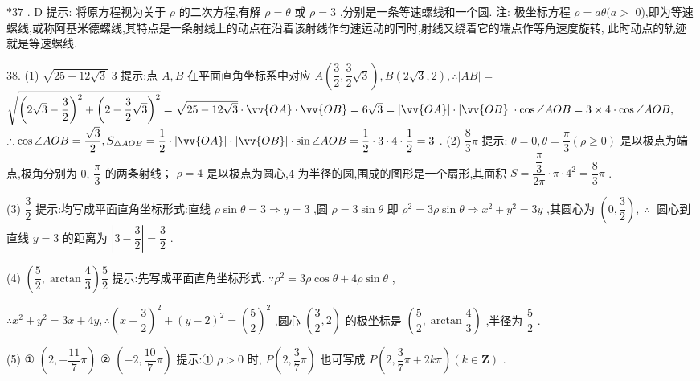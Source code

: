 $* {37}$ . D 提示: 将原方程视为关于 $\rho$ 的二次方程,有解 $\rho  = \theta$ 或 $\rho  = 3$ ,分别是一条等速螺线和一个圆. 注: 极坐标方程 $\rho  = {a\theta }(a >$ 0),即为等速螺线,或称阿基米德螺线,其特点是一条射线上的动点在沿着该射线作匀速运动的同时,射线又绕着它的端点作等角速度旋转, 此时动点的轨迹就是等速螺线.

38. (1) $\sqrt{{25} - {12}\sqrt{3}}\;3$ 提示:点 $A,B$ 在平面直角坐标系中对应 $A\left( {\dfrac{3}{2},\dfrac{3}{2}\sqrt{3}}\right) ,B\left( {2\sqrt{3},2}\right) ,\therefore \left| {AB}\right|  =$  $\sqrt{{\left( 2\sqrt{3} - \dfrac{3}{2}\right) }^{2} + {\left( 2 - \dfrac{3}{2}\sqrt{3}\right) }^{2}} = \sqrt{{25} - {12}\sqrt{3}} \cdot  \vv{OA} \cdot  \vv{OB} = 6\sqrt{3} = \left| \vv{OA}\right|  \cdot  \left| \vv{OB}\right|  \cdot  \cos \angle {AOB} = 3 \times  4 \cdot  \cos \angle {AOB},$  $\therefore \cos \angle {AOB} = \dfrac{\sqrt{3}}{2},{S}_{\bigtriangleup {AOB}} = \dfrac{1}{2} \cdot  \left| \vv{OA}\right|  \cdot  \left| \vv{OB}\right|  \cdot  \sin \angle {AOB} = \dfrac{1}{2} \cdot  3 \cdot  4 \cdot  \dfrac{1}{2} = 3$ . (2) $\dfrac{8}{3}\pi$ 提示: $\theta  = 0,\theta  = \dfrac{\pi }{3}\left( {\rho  \geq  0}\right)$ 是以极点为端点,极角分别为 0, $\dfrac{\pi }{3}$ 的两条射线； $\rho  = 4$ 是以极点为圆心,4 为半径的圆,围成的图形是一个扇形,其面积 $S = \dfrac{\dfrac{\pi }{3}}{2\pi } \cdot  \pi  \cdot  {4}^{2} = \dfrac{8}{3}\pi$ .

(3) $\dfrac{3}{2}$ 提示:均写成平面直角坐标形式:直线 $\rho \sin \theta  = 3 \Rightarrow  y = 3$ ,圆 $\rho  = 3\sin \theta$ 即 ${\rho }^{2} = {3\rho }\sin \theta  \Rightarrow  {x}^{2} + {y}^{2} = {3y}$ ,其圆心为 $\left( {0,\dfrac{3}{2}}\right) ,\;\therefore \;$ 圆心到直线 $y = 3$ 的距离为 $\left| {3 - \dfrac{3}{2}}\right|  = \dfrac{3}{2}$ .

(4) $\left( {\dfrac{5}{2},\arctan \dfrac{4}{3}}\right) \dfrac{5}{2}$ 提示:先写成平面直角坐标形式. $\because {\rho }^{2} = {3\rho }\cos \theta  + {4\rho }\sin \theta$ ,

$\therefore {x}^{2} + {y}^{2} = {3x} + {4y},\therefore {\left( x - \dfrac{3}{2}\right) }^{2} + {\left( y - 2\right) }^{2} = {\left( \dfrac{5}{2}\right) }^{2}$ ,圆心 $\left( {\dfrac{3}{2},2}\right)$ 的极坐标是 $\left( {\dfrac{5}{2},\arctan \dfrac{4}{3}}\right)$ ,半径为 $\dfrac{5}{2}$ .

(5) ① $\left( {2, - \dfrac{11}{7}\pi }\right)$ ② $\left( {-2,\dfrac{10}{7}\pi }\right)$ 提示:① $\rho  > 0$ 时, $P\left( {2,\dfrac{3}{7}\pi }\right)$ 也可写成 $P\left( {2,\dfrac{3}{7}\pi  + {2k\pi }}\right) \left( {k \in  \mathbf{Z}}\right)$ .

